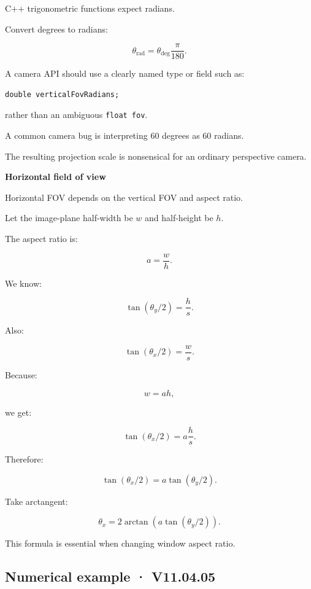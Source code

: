 \hypertarget{02-foundations-ii-ch033-units-degrees-versus-radians}{}

C++ trigonometric functions expect radians.

Convert degrees to radians:

\[
 \boxed{ \theta_{\mathrm{rad}}= \theta_{\mathrm{deg}}\frac\pi{180} }.
\]

A camera API should use a clearly named type or field such as:

\begin{verbatim}
double verticalFovRadians;
\end{verbatim}

rather than an ambiguous \texttt{float\ fov}.

A common camera bug is interpreting 60 degrees as 60 radians.

The resulting projection scale is nonsensical for an ordinary perspective camera.

\textbf{Horizontal field of view}

Horizontal FOV depends on the vertical FOV and aspect ratio.

Let the image-plane half-width be \(w\) and half-height be \(h\).

The aspect ratio is:

\[
 a=\frac wh.
\]

We know:

\[
 \tan(\theta_y/2)=\frac hs.
\]

Also:

\[
 \tan(\theta_x/2)=\frac ws.
\]

Because:

\[
 w=ah,
\]

we get:

\[
 \tan(\theta_x/2) = a\frac hs.
\]

Therefore:

\[
 \boxed{ \tan(\theta_x/2) = a\tan(\theta_y/2) }.
\]

Take arctangent:

\[
 \boxed{ \theta_x= 2\arctan \left( a\tan(\theta_y/2) \right) }.
\]

This formula is essential when changing window aspect ratio.

\subsection{Numerical example · V11.04.05}\label{02-foundations-ii-ch033-numerical-example-v11.04.05}

\hypertarget{02-foundations-ii-ch033-numerical-example-v11.04.05}{}

